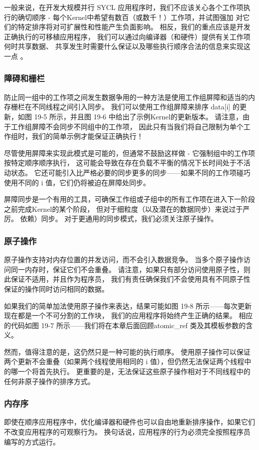 一般来说，在开发大规模并行 SYCL 应用程序时，我们不应该关心各个工作项执行的确切顺序 
- 每个Kernel中希望有数百（或数千！）工作项，并试图强加 对它们的特定排序将对可扩展性和性能产生负面影响。 
相反，我们的重点应该是开发正确执行的可移植应用程序，
我们可以通过向编译器（和硬件）提供有关工作项何时共享数据、
共享发生时需要什么保证以及哪些执行顺序合法的信息来实现这一点 。

\subsubsection{障碍和栅栏}
防止同一组中的工作项之间发生数据争用的一种方法是使用工作组屏障和适当的内存栅栏在不同线程之间引入同步。 
我们可以使用工作组屏障来排序 data[i] 的更新，如图 19-5 所示，并且图 19-6 中给出了示例Kernel的更新版本。 
请注意，由于工作组屏障不会同步不同组中的工作项，
因此只有当我们将自己限制为单个工作组时，我们的简单示例才能保证正确执行！

尽管使用屏障来实现此模式是可能的，但通常不鼓励这样做 - 它强制组中的工作项按特定顺序顺序执行，
这可能会导致在存在负载不平衡的情况下长时间处于不活动状态。 
它还可能引入比严格必要的同步更多的同步——如果不同的工作项碰巧使用不同的 i 值，它们仍将被迫在屏障处同步。

屏障同步是一个有用的工具，可确保工作组或子组中的所有工作项在进入下一阶段之前完成Kernel的某个阶段，
但对于细粒度（以及潜在的数据同步）来说过于严厉。 依赖）同步。 对于更通用的同步模式，我们必须关注原子操作。

\subsubsection{原子操作}
原子操作支持对内存位置的并发访问，而不会引入数据竞争。 当多个原子操作访问同一内存时，保证它们不会重叠。 
请注意，如果只有部分访问使用原子性，则此保证不适用，并且作为程序员，
我们有责任确保我们不会使用具有不同原子性保证的操作同时访问相同的数据。

如果我们的简单加法使用原子操作来表达，结果可能如图 19-8 所示——每次更新现在都是一个不可分割的工作块，
我们的应用程序将始终产生正确的结果。 
相应的代码如图 19-7 所示——我们将在本章后面回顾atomic\_ref 类及其模板参数的含义。

然而，值得注意的是，这仍然只是一种可能的执行顺序。 
使用原子操作可以保证两个更新不会重叠（如果两个线程使用相同的 i 值），但仍然无法保证两个线程中的哪一个将首先执行。 
更重要的是，无法保证这些原子操作相对于不同线程中的任何非原子操作的排序方式。

\subsubsection{内存序}
即使在顺序应用程序中，优化编译器和硬件也可以自由地重新排序操作，如果它们不改变应用程序的可观察行为。 
换句话说，应用程序的行为必须完全按照程序员编写的方式运行。

